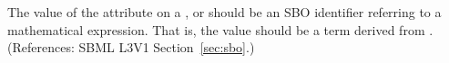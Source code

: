 The value of the  attribute on a \AlgebraicRule, \RateRule or
\AssignmentRule should be an SBO identifier referring to a mathematical
expression.  That is, the value should be a term derived from
\sbomathformula.  (References: SBML L3V1 Section~\ref{sec:sbo}.)
